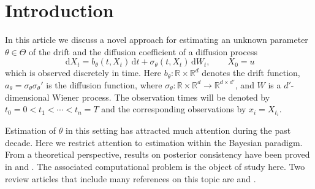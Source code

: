 \documentclass[preprint]{imsart}
\newcommand{\si}{\sigma}
\renewcommand{\th}{\theta}
\newcommand{\RR}{\mathbb{R}}
\theoremstyle{definition}
\newcommand{\dd}{{\,\mathrm d}}
\begin{document}
\begin{frontmatter}
\begin{abstract}
\medskip

\noindent
 \emph{ {Keywords:} Multidimensional diffusion bridge;  data augmentation; discretisation of path integral; linear process; innovation process; non-centred parametrisation; FitzHugh-Nagumo model.}
 \end{abstract}



\begin{keyword}[class=MSC]
\end{keyword}
%



\end{frontmatter}







\section{Introduction}
In this article we discuss a novel approach for estimating an unknown parameter $\th \in \Theta$  of the drift and the diffusion coefficient of a diffusion process
\begin{equation}\label{sde}
 \dd X_t = b_\th(t,X_t) \dd t + \si_\th(t,X_t) \dd W_t, \qquad X_0=u  \end{equation}
which is observed discretely in time. Here $b_\th\colon \RR \times \RR^{d}$ denotes the drift function, $a_\th = \si_\th\si_\th'$ is the diffusion function, where $\si_\th\colon \RR \times \RR^d \to \RR^{d\times d'}$, and $W$ is a $d'$-dimensional Wiener process. The observation times will be denoted by $t_0 = 0 < t_1<\cdots< t_n=T$ and the corresponding observations by $x_i=X_{t_i}$. 

Estimation of $\th$ in this setting has attracted much attention during the past decade. Here we restrict attention to estimation within the Bayesian paradigm. From a theoretical perspective, results on posterior consistency have been proved in \cite{vdMeulenvZanten} and \cite{GugushviliSpreij}. The associated computational problem is the object of study here. Two  review articles that include many references on this topic are \cite{vZanten} and \cite{Sorensen}.
\end{document}

